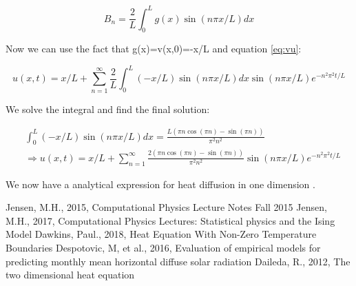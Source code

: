 \documentclass{article}
\begin{document}
\begin{equation}
B_n=\frac{2}{L}\int_0^Lg(x)\sin{(n\pi x/L)} dx
\end{equation}

Now we can use the fact that g(x)=v(x,0)=-x/L and equation \ref{eq:vu}:

\begin{equation}
u(x,t)=x/L+\sum_{n=1}^{\infty}\frac{2}{L}\int_0^L(-x/L)\sin{(n\pi x/L)} dx\sin{(n\pi x/L)}e^{-n^2\pi^2t/L}
\end{equation}

We solve the integral and find the final solution:

\begin{equation*}
\begin{split}
&\int_0^L(-x/L)\sin{(n\pi x/L)} dx=\frac{L(\pi n \cos{(\pi n)}-\sin{(\pi n)})}{\pi^2n^2}\\
&\Rightarrow u(x,t)=x/L+\sum_{n=1}^{\infty}\frac{2(\pi n \cos{(\pi n)}-\sin{(\pi n)})}{\pi^2n^2}\sin{(n\pi x/L)}e^{-n^2\pi^2t/L}
\end{split}
\end{equation*}

We now have a analytical expression for heat diffusion in one dimension \cite{94}\cite{96}. 


\begin{thebibliography}{9}
	Jensen, M.H., 2015, Computational Physics Lecture Notes Fall 2015
	Jensen, M.H., 2017, Computational Physics Lectures: Statistical physics and the Ising Model
	Dawkins, Paul., 2018, Heat Equation With Non-Zero Temperature Boundaries
	Despotovic, M, et al., 2016, Evaluation of empirical models for predicting monthly mean horizontal diffuse solar radiation
	Daileda, R.,  2012, The two dimensional heat equation
	
\end{thebibliography}
\end{document}
